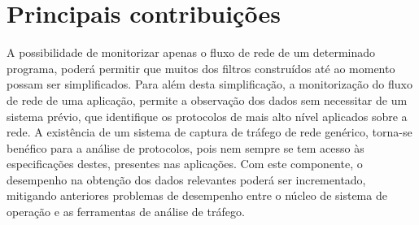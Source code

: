 
\section{Principais contribuições} 
\label{sec:intro_contribuicoes}

A possibilidade de monitorizar apenas o fluxo de rede de um determinado programa, poderá permitir que muitos dos filtros construídos até ao momento possam ser simplificados.
Para além desta simplificação, a monitorização do fluxo de rede de uma aplicação, permite a observação dos dados sem necessitar de um sistema prévio, que identifique os protocolos de mais alto nível aplicados sobre a rede.
A existência de um sistema de captura de tráfego de rede genérico, torna-se benéfico para a análise de protocolos, pois nem sempre se tem acesso às especificações destes, presentes nas aplicações.
Com este componente, o desempenho na obtenção dos dados relevantes poderá ser incrementado, mitigando anteriores problemas de desempenho entre o núcleo de sistema de operação e as ferramentas de análise de tráfego.






